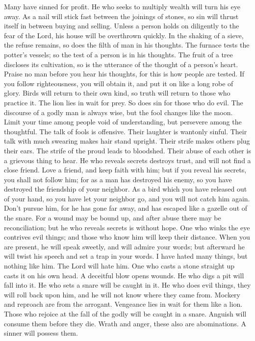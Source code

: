  Many have sinned for profit. He who seeks to multiply
wealth will turn his eye away.  As a nail will stick fast
between the joinings of stones, so sin will thrust itself in between
buying and selling.  Unless a person holds on diligently to
the fear of the Lord, his house will be overthrown quickly. 
In the shaking of a sieve, the refuse remains, so does the filth of man
in his thoughts.  The furnace tests the potter's vessels; so
the test of a person is in his thoughts.  The fruit of a
tree discloses its cultivation, so is the utterance of the thought of a
person's heart.  Praise no man before you hear his thoughts,
for this is how people are tested.  If you follow
righteousness, you will obtain it, and put it on like a long robe of
glory.  Birds will return to their own kind, so truth will
return to those who practice it.  The lion lies in wait for
prey. So does sin for those who do evil.  The discourse of
a godly man is always wise, but the fool changes like the moon.
 Limit your time among people void of understanding, but
persevere among the thoughtful.  The talk of fools is
offensive. Their laughter is wantonly sinful.  Their talk
with much swearing makes hair stand upright. Their strife makes others
plug their ears.  The strife of the proud leads to
bloodshed. Their abuse of each other is a grievous thing to hear.
 He who reveals secrets destroys trust, and will not find a
close friend.  Love a friend, and keep faith with him; but
if you reveal his secrets, you shall not follow him;  for
as a man has destroyed his enemy, so you have destroyed the friendship
of your neighbor.  As a bird which you have released out of
your hand, so you have let your neighbor go, and you will not catch him
again.  Don't pursue him, for he has gone far away, and has
escaped like a gazelle out of the snare.  For a wound may
be bound up, and after abuse there may be reconciliation; but he who
reveals secrets is without hope.  One who winks the eye
contrives evil things; and those who know him will keep their distance.
 When you are present, he will speak sweetly, and will
admire your words; but afterward he will twist his speech and set a trap
in your words.  I have hated many things, but nothing like
him. The Lord will hate him.  One who casts a stone
straight up casts it on his own head. A deceitful blow opens wounds.
 He who digs a pit will fall into it. He who sets a snare
will be caught in it.  He who does evil things, they will
roll back upon him, and he will not know where they came from.
 Mockery and reproach are from the arrogant. Vengeance lies
in wait for them like a lion.  Those who rejoice at the
fall of the godly will be caught in a snare. Anguish will consume them
before they die.  Wrath and anger, these also are
abominations. A sinner will possess them.

